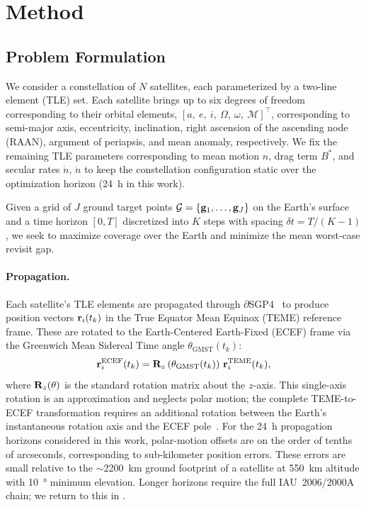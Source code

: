 \section{Method}
\label{sec:method}

\subsection{Problem Formulation}
\label{sec:setup}

We consider a constellation of $N$ satellites, each parameterized by a two-line element (TLE) set. 
Each satellite brings up to six degrees of freedom corresponding to their orbital elements, $[a,~e,~i,~\Omega,~\omega,~\mathcal{M}]^\top$, corresponding to semi-major axis, eccentricity, inclination, right ascension of the ascending node (RAAN), argument of periapsis, and mean anomaly, respectively.
We fix the remaining TLE parameters corresponding to mean motion $n$, drag term $B^*$, and secular rates $\dot{n}$, $\ddot{n}$ to keep the constellation configuration static over the optimization horizon (\SI{24}{\hour} in this work).

Given a grid of $J$ ground target points $\mathcal{G} = \{\mathbf{g}_1, \ldots, \mathbf{g}_J\}$ on the Earth's surface and a time horizon $[0, T]$ discretized into $K$ steps with spacing $\delta t = T/(K-1)$, we seek to maximize coverage over the Earth and minimize the mean worst-case revisit gap.

\paragraph{Propagation.}
Each satellite's TLE elements are propagated through $\partial$SGP4~\citep{acciarini_closing_2025} to produce position vectors $\mathbf{r}_i(t_k)$ in the True Equator Mean Equinox (TEME) reference frame.
These are rotated to the Earth-Centered Earth-Fixed (ECEF) frame via the Greenwich Mean Sidereal Time angle $\theta_{\text{GMST}}(t_k)$:
\begin{equation}
    \mathbf{r}_i^{\text{ECEF}}(t_k) = \mathbf{R}_z\left(\theta_{\text{GMST}}(t_k)\right) \, \mathbf{r}_i^{\text{TEME}}(t_k),
    \label{eq:teme_to_ecef}
\end{equation}
where $\mathbf{R}_z(\theta)$ is the standard rotation matrix about the $z$-axis.
This single-axis rotation is an approximation and neglects polar motion; the complete TEME-to-ECEF transformation requires an additional rotation between the Earth's instantaneous rotation axis and the ECEF pole~\citep{vallado_revisiting_nodate}.
For the \SI{24}{\hour} propagation horizons considered in this work,
polar-motion offsets are on the order of tenths of arcseconds,
corresponding to sub-kilometer position errors. These errors are small
relative to the $\sim$\SI{2200}{\kilo\metre} ground footprint
of a satellite at \SI{550}{\kilo\metre} altitude with
\SI{10}{\degree} minimum elevation. Longer horizons require the full IAU~2006/2000A chain; we return to this in .

